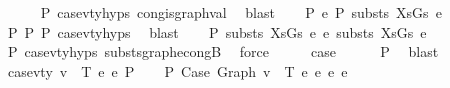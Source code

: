 \begin{isabellebody}
\ \ \ \ \isamarkupfalse%
\ P{}\ case{}{\isacharunderscore}{\kern0pt}v{\isacharunderscore}{\kern0pt}ty{\isachardot}{\kern0pt}hyps{\isacharparenleft}{\kern0pt}{}{\isacharparenright}{\kern0pt}\ cong{\isacharunderscore}{\kern0pt}is{\isacharunderscore}{\kern0pt}graph{\isacharunderscore}{\kern0pt}val\ \isamarkupfalse%
\ blast\isanewline
\isanewline
\ \ \isamarkupfalse%
\ P{}{\isacharcolon}{\kern0pt}\ {\isachardoublequoteopen}e{}{\isacharprime}{\kern0pt}\ {\isacharminus}{\kern0pt}{\isachargreater}{\kern0pt}{\isacharbraceleft}{\kern0pt}P{\isacharbraceright}{\kern0pt}\ substs\ XsGs\ e{}{\isacharprime}{\kern0pt}{\isacharprime}{\kern0pt}{\isachardoublequoteclose}\isanewline
\ \ \ \ \isamarkupfalse%
\ P{}\ P{}\ P{}\ case{}{\isacharunderscore}{\kern0pt}v{\isacharunderscore}{\kern0pt}ty{\isachardot}{\kern0pt}hyps{\isacharparenleft}{\kern0pt}{}{\isacharcomma}{\kern0pt}{}{\isacharcomma}{\kern0pt}{}{\isacharparenright}{\kern0pt}\ \isamarkupfalse%
\ blast\isanewline
\isanewline
\ \ \isamarkupfalse%
\ P{}{\isacharcolon}{\kern0pt}\ {\isachardoublequoteopen}substs\ XsGs\ e{}\ {\isasymsimeq}e\ substs\ XsGs\ e{}{\isacharprime}{\kern0pt}{\isacharprime}{\kern0pt}{\isachardoublequoteclose}\isanewline
\ \ \ \ \isamarkupfalse%
\ P{}\ case{}{\isacharunderscore}{\kern0pt}v{\isacharunderscore}{\kern0pt}ty{\isachardot}{\kern0pt}hyps{\isacharparenleft}{\kern0pt}{}{\isacharparenright}{\kern0pt}\ substs{\isacharunderscore}{\kern0pt}graph{\isacharunderscore}{\kern0pt}econg{}B\ \isamarkupfalse%
\ force\isanewline
\isanewline
\ \ \isamarkupfalse%
\ \isamarkupfalse%
\ {\isacharquery}{\kern0pt}case\isanewline
\ \ \ \ \isamarkupfalse%
\ P{}\ \isamarkupfalse%
\ blast\isanewline
{}\isamarkupfalse%
\isanewline
\ \ \isamarkupfalse%
\ {\isacharparenleft}{\kern0pt}case{}{\isacharunderscore}{\kern0pt}v{\isacharunderscore}{\kern0pt}ty\ v\ {\isasymGamma}\ T\ e{}\ e{}\ P{\isacharparenright}{\kern0pt}\isanewline
\ \ \isamarkupfalse%
\ P{}{\isacharcolon}{\kern0pt}\ {\isachardoublequoteopen}Case\ {\isacharparenleft}{\kern0pt}Graph\ v{\isacharparenright}{\kern0pt}\ {\isasymGamma}\ T\ e{}\ e{}\ {\isasymsimeq}e\ e{}{\isacharprime}{\kern0pt}{\isachardoublequoteclose}\isanewline

\end{isabellebody}
